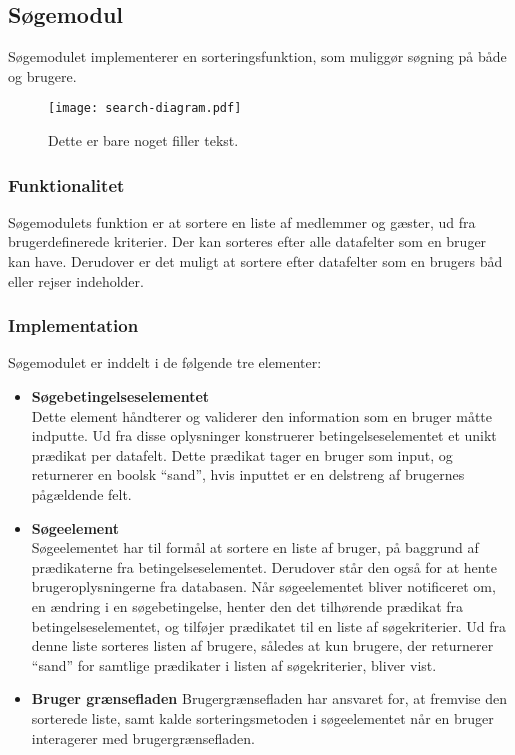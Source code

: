 \subsection{Søgemodul}
\label{sub:s_searchmodul}

Søgemodulet implementerer en sorteringsfunktion, som muliggør søgning på både og brugere.

\begin{figure}
  \centering
  \texttt{[image: search-diagram.pdf]}
  \caption{Dette er bare noget filler tekst.}
\end{figure}
\subsubsection{Funktionalitet}
\label{sub:funktionalitet}

Søgemodulets funktion er at sortere en liste af medlemmer og gæster, ud fra brugerdefinerede kriterier. Der kan sorteres efter alle datafelter som en bruger kan have. Derudover er det muligt at sortere efter datafelter som en brugers båd eller rejser indeholder.

\subsubsection{Implementation}
\label{sub:implementation}

Søgemodulet er inddelt i de følgende tre elementer:

\begin{itemize}
	\item \textbf{Søgebetingelseselementet} \\
		Dette element håndterer og validerer den information som en bruger måtte indputte. Ud fra disse oplysninger konstruerer betingelseselementet et unikt prædikat per datafelt. Dette prædikat tager en bruger som input, og returnerer en boolsk \enquote{sand}, hvis inputtet er en delstreng af brugernes pågældende felt.

	\item \textbf{Søgeelement} \\
    Søgeelementet har til formål at sortere en liste af bruger, på baggrund af prædikaterne fra betingelseselementet. Derudover står den også for at hente brugeroplysningerne fra databasen. Når søgeelementet bliver notificeret om, en ændring i en søgebetingelse, henter den det tilhørende prædikat fra betingelseselementet, og tilføjer prædikatet til en liste af søgekriterier. Ud fra denne liste sorteres listen af brugere, således at kun brugere, der returnerer \enquote{sand} for samtlige prædikater i listen af søgekriterier, bliver vist.

	\item \textbf{Bruger grænsefladen}
		Brugergrænsefladen har ansvaret for, at fremvise den sorterede liste, samt kalde sorteringsmetoden i søgeelementet når en bruger interagerer med brugergrænsefladen.
\end{itemize}



